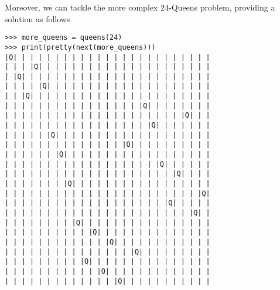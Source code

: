 Moreover, we can tackle the more complex $24$-Queens problem, providing a
solution as follows
\newpage
\begin{verbatim}
>>> more_queens = queens(24)
>>> print(pretty(next(more_queens)))
|Q| | | | | | | | | | | | | | | | | | | | | | | |
| | | |Q| | | | | | | | | | | | | | | | | | | | |
| |Q| | | | | | | | | | | | | | | | | | | | | | |
| | | | |Q| | | | | | | | | | | | | | | | | | | |
| | |Q| | | | | | | | | | | | | | | | | | | | | |
| | | | | | | | | | | | | | | | |Q| | | | | | | |
| | | | | | | | | | | | | | | | | | | | | |Q| | |
| | | | | | | | | | | | | | | | | |Q| | | | | | |
| | | | | |Q| | | | | | | | | | | | | | | | | | |
| | | | | | | | | | | | | | |Q| | | | | | | | | |
| | | | | | |Q| | | | | | | | | | | | | | | | | |
| | | | | | | | | | | | | | | | | | |Q| | | | | |
| | | | | | | | | | | | | | | | | | | | |Q| | | |
| | | | | | | |Q| | | | | | | | | | | | | | | | |
| | | | | | | | | | | | | | | | | | | | | | | |Q|
| | | | | | | | | | | | | | | | | | | |Q| | | | |
| | | | | | | | | | | | | | | | | | | | | | |Q| |
| | | | | | | | |Q| | | | | | | | | | | | | | | |
| | | | | | | | | | |Q| | | | | | | | | | | | | |
| | | | | | | | | | | | |Q| | | | | | | | | | | |
| | | | | | | | | | | | | | | |Q| | | | | | | | |
| | | | | | | | | |Q| | | | | | | | | | | | | | |
| | | | | | | | | | | |Q| | | | | | | | | | | | |
| | | | | | | | | | | | | |Q| | | | | | | | | | |
\end{verbatim}


